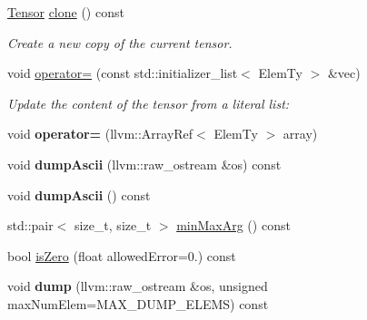 \begin{DoxyCompactItemize}
\item 
\mbox{\label{classglow_1_1_handle_a2b958e66171d3824c9c7e67972c419ea}} 
\hyperlink{classglow_1_1_tensor}{Tensor} \hyperlink{classglow_1_1_handle_a2b958e66171d3824c9c7e67972c419ea}{clone} () const
\begin{DoxyCompactList}\small\item\em Create a new copy of the current tensor. \end{DoxyCompactList}\item 
\mbox{\label{classglow_1_1_handle_afe50bb3902caf5a41a874e93fedfc872}} 
void \hyperlink{classglow_1_1_handle_afe50bb3902caf5a41a874e93fedfc872}{operator=} (const std\+::initializer\+\_\+list$<$ Elem\+Ty $>$ \&vec)
\begin{DoxyCompactList}\small\item\em Update the content of the tensor from a literal list\+: \end{DoxyCompactList}\item 
\mbox{\label{classglow_1_1_handle_a827aa2c9d05d80c7b0cd0947012e30bc}} 
void {\bfseries operator=} (llvm\+::\+Array\+Ref$<$ Elem\+Ty $>$ array)
\item 
\mbox{\label{classglow_1_1_handle_a19ab471b0a2db4245382692a87d8d117}} 
void {\bfseries dump\+Ascii} (llvm\+::raw\+\_\+ostream \&os) const
\item 
\mbox{\label{classglow_1_1_handle_a71aa58ad75ec36c3abbd673c552b4d67}} 
void {\bfseries dump\+Ascii} () const
\item 
std\+::pair$<$ size\+\_\+t, size\+\_\+t $>$ \hyperlink{classglow_1_1_handle_ac4004af33a68096e15f642e5e91d954d}{min\+Max\+Arg} () const
\item 
bool \hyperlink{classglow_1_1_handle_add064d7f0e9c193dd326e237a3a2f767}{is\+Zero} (float allowed\+Error=0.) const
\item 
\mbox{\label{classglow_1_1_handle_ab2855b35850a35e27d81c184c1e9a035}} 
void {\bfseries dump} (llvm\+::raw\+\_\+ostream \&os, unsigned max\+Num\+Elem=M\+A\+X\+\_\+\+D\+U\+M\+P\+\_\+\+E\+L\+E\+MS) const
\item 
\mbox{\label{classglow_1_1_handle_a71d7eb7099d95288357f7946c7ab8f4b}} 

\end{DoxyCompactItemize}

